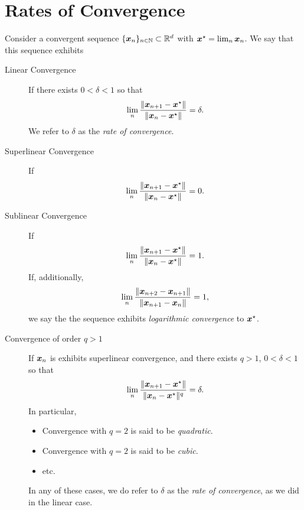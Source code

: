 
\chapter{Rates of Convergence}\label{appendix:convergence}

\begin{definition}
Consider a convergent sequence $\{ \boldsymbol{x}_n \}_{n\in\mathbb{N}} \subset \mathbb{R}^d$ with $\boldsymbol{x}^{\star}=\lim_n \boldsymbol{x}_n$.  We say that this sequence exhibits
\begin{description}
	\item [Linear Convergence] If there exists $0<\delta<1$ so that 
	\begin{equation*}
	\lim_n \frac{\lVert \boldsymbol{x}_{n+1} - \boldsymbol{x}^{\star} \rVert}{\lVert \boldsymbol{x}_n - \boldsymbol{x}^{\star} \rVert}=\delta.
	\end{equation*}
	We refer to $\delta$ as the \emph{rate of convergence}.
	\item [Superlinear Convergence] If 
	\begin{equation*}
	\lim_n \frac{\lVert \boldsymbol{x}_{n+1} - \boldsymbol{x}^{\star} \rVert}{\lVert \boldsymbol{x}_n - \boldsymbol{x}^{\star} \rVert}=0.
	\end{equation*}
	\item [Sublinear Convergence] If
	\begin{equation*}
	\lim_n \frac{\lVert \boldsymbol{x}_{n+1} - \boldsymbol{x}^{\star} \rVert}{\lVert \boldsymbol{x}_n - \boldsymbol{x}^{\star} \rVert}=1.
	\end{equation*}
	If, additionally, 
	\begin{equation*}
	\lim_n \frac{\lVert \boldsymbol{x}_{n+2} - \boldsymbol{x}_{n+1} \rVert}{\lVert \boldsymbol{x}_{n+1} - \boldsymbol{x}_n \rVert}=1,
	\end{equation*}
	we say the the sequence exhibits \emph{logarithmic convergence} to $\boldsymbol{x}^{\star}$.
	\item [Convergence of order $q>1$] If $\boldsymbol{x}_n$ is exhibits superlinear convergence, and there exists $q>1$, $0<\delta<1$ so that 
	\begin{equation*}
	\lim_n \frac{\lVert \boldsymbol{x}_{n+1} - \boldsymbol{x}^{\star} \rVert}{\lVert \boldsymbol{x}_n - \boldsymbol{x}^{\star} \rVert^q}=\delta.
	\end{equation*}
	In particular, 
	\begin{itemize}
		\item Convergence with $q=2$ is said to be \emph{quadratic}.
		\item Convergence with $q=2$ is said to be \emph{cubic}.
		\item etc.
	\end{itemize}
	In any of these cases, we do refer to $\delta$ as the \emph{rate of convergence}, as we did in the linear case.
\end{description}
\end{definition}

